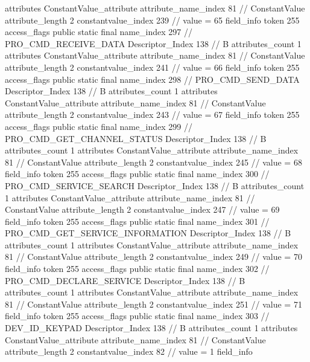 {{{{{				attributes {
				ConstantValue_attribute {
					attribute_name_index	81		// ConstantValue
					attribute_length	2
					constantvalue_index	239		// value = 65
				}
				}
			}
			field_info {
				token	255
				access_flags	public static final
				name_index	297		// PRO_CMD_RECEIVE_DATA
				Descriptor_Index	138		// B
				attributes_count	1
				attributes {
				ConstantValue_attribute {
					attribute_name_index	81		// ConstantValue
					attribute_length	2
					constantvalue_index	241		// value = 66
				}
				}
			}
			field_info {
				token	255
				access_flags	public static final
				name_index	298		// PRO_CMD_SEND_DATA
				Descriptor_Index	138		// B
				attributes_count	1
				attributes {
				ConstantValue_attribute {
					attribute_name_index	81		// ConstantValue
					attribute_length	2
					constantvalue_index	243		// value = 67
				}
				}
			}
			field_info {
				token	255
				access_flags	public static final
				name_index	299		// PRO_CMD_GET_CHANNEL_STATUS
				Descriptor_Index	138		// B
				attributes_count	1
				attributes {
				ConstantValue_attribute {
					attribute_name_index	81		// ConstantValue
					attribute_length	2
					constantvalue_index	245		// value = 68
				}
				}
			}
			field_info {
				token	255
				access_flags	public static final
				name_index	300		// PRO_CMD_SERVICE_SEARCH
				Descriptor_Index	138		// B
				attributes_count	1
				attributes {
				ConstantValue_attribute {
					attribute_name_index	81		// ConstantValue
					attribute_length	2
					constantvalue_index	247		// value = 69
				}
				}
			}
			field_info {
				token	255
				access_flags	public static final
				name_index	301		// PRO_CMD_GET_SERVICE_INFORMATION
				Descriptor_Index	138		// B
				attributes_count	1
				attributes {
				ConstantValue_attribute {
					attribute_name_index	81		// ConstantValue
					attribute_length	2
					constantvalue_index	249		// value = 70
				}
				}
			}
			field_info {
				token	255
				access_flags	public static final
				name_index	302		// PRO_CMD_DECLARE_SERVICE
				Descriptor_Index	138		// B
				attributes_count	1
				attributes {
				ConstantValue_attribute {
					attribute_name_index	81		// ConstantValue
					attribute_length	2
					constantvalue_index	251		// value = 71
				}
				}
			}
			field_info {
				token	255
				access_flags	public static final
				name_index	303		// DEV_ID_KEYPAD
				Descriptor_Index	138		// B
				attributes_count	1
				attributes {
				ConstantValue_attribute {
					attribute_name_index	81		// ConstantValue
					attribute_length	2
					constantvalue_index	82		// value = 1
				}
				}
			}
			field_info {
}}}}}
